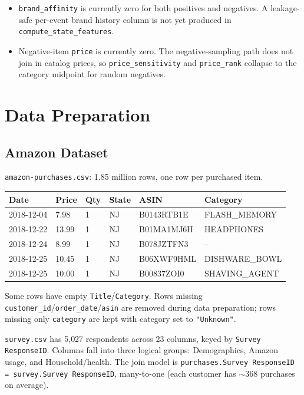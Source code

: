 \documentclass[11pt,a4paper]{article}
\begin{document}
\begin{itemize}
\item \texttt{brand\_affinity} is currently zero for both positives and negatives.  A leakage-safe per-event brand history column is not yet produced in \texttt{compute\_state\_features}.
\item Negative-item \texttt{price} is currently zero.  The negative-sampling path does not join in catalog prices, so \texttt{price\_sensitivity} and \texttt{price\_rank} collapse to the category midpoint for random negatives.
\end{itemize}


\section{Data Preparation}
\label{sec:data-prep}

\subsection{Amazon Dataset}

\texttt{amazon-purchases.csv}: 1.85 million rows, one row per purchased item.

\begin{table}[H]\centering\tiny
\begin{tabular}{llllll}
\toprule
Date & Price & Qty & State & ASIN & Category \\
\midrule
2018-12-04 & 7.98  & 1 & NJ & B0143RTB1E & FLASH\_MEMORY \\
2018-12-22 & 13.99 & 1 & NJ & B01MA1MJ6H & HEADPHONES \\
2018-12-24 & 8.99  & 1 & NJ & B078JZTFN3 & -- \\
2018-12-25 & 10.45 & 1 & NJ & B06XWF9HML & DISHWARE\_BOWL \\
2018-12-25 & 10.00 & 1 & NJ & B00837ZOI0 & SHAVING\_AGENT \\
\bottomrule
\end{tabular}
\end{table}

Some rows have empty \texttt{Title}/\texttt{Category}.  Rows missing \texttt{customer\_id}/\texttt{order\_date}/\texttt{asin} are removed during data preparation; rows missing only \texttt{category} are kept with category set to \texttt{"Unknown"}.

\texttt{survey.csv} has 5{,}027 respondents across 23 columns, keyed by \texttt{Survey ResponseID}.  Columns fall into three logical groups: Demographics, Amazon usage, and Household/health.  The join model is \texttt{purchases.Survey ResponseID = survey.Survey ResponseID}, many-to-one (each customer has ${\sim}368$ purchases on average).
\end{document}
